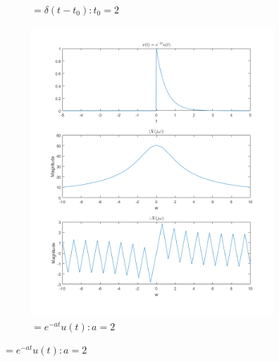 \documentclass[11pt]{article}
\begin{document}
\begin{figure}
\begin{subfigure}[b]{.3\linewidth}
\caption{$ = \delta (t-t_{0}) : t_{0}=2$}
\end{subfigure}
\begin{subfigure}[b]{.3\linewidth}
\includegraphics[width=\linewidth]{q2f}
\caption{$ = e^{-at}u(t) : a=2 $}
\end{subfigure}


\end{figure}
\end{document}
